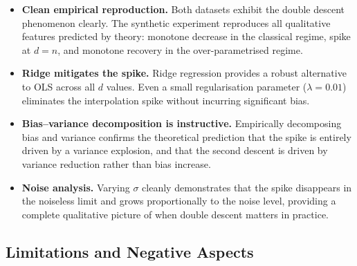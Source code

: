 \documentclass[11pt,a4paper]{article}
\begin{document}
\begin{itemize}
  \item \textbf{Clean empirical reproduction.}
        Both datasets exhibit the double descent phenomenon clearly.
        The synthetic experiment reproduces all qualitative features predicted by theory:
        monotone decrease in the classical regime, spike at $d = n$, and monotone recovery
        in the over-parametrised regime.

  \item \textbf{Ridge mitigates the spike.}
        Ridge regression provides a robust alternative to OLS across all $d$ values.
        Even a small regularisation parameter ($\lambda = 0.01$) eliminates the interpolation
        spike without incurring significant bias.

  \item \textbf{Bias--variance decomposition is instructive.}
        Empirically decomposing bias and variance confirms the theoretical prediction that the
        spike is entirely driven by a variance explosion, and that the second descent is driven
        by variance reduction rather than bias increase.

  \item \textbf{Noise analysis.}
        Varying $\sigma$ cleanly demonstrates that the spike disappears in the noiseless limit
        and grows proportionally to the noise level, providing a complete qualitative picture
        of when double descent matters in practice.
\end{itemize}

\subsection{Limitations and Negative Aspects}
\end{document}
